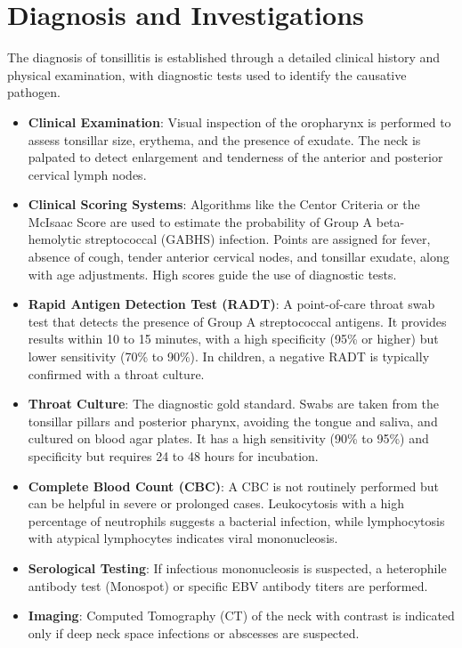 \section*{Diagnosis and Investigations}
The diagnosis of tonsillitis is established through a detailed clinical history and physical examination, with diagnostic tests used to identify the causative pathogen.
\begin{itemize}
    \item \textbf{Clinical Examination}: Visual inspection of the oropharynx is performed to assess tonsillar size, erythema, and the presence of exudate. The neck is palpated to detect enlargement and tenderness of the anterior and posterior cervical lymph nodes.
    \item \textbf{Clinical Scoring Systems}: Algorithms like the Centor Criteria or the McIsaac Score are used to estimate the probability of Group A beta-hemolytic streptococcal (GABHS) infection. Points are assigned for fever, absence of cough, tender anterior cervical nodes, and tonsillar exudate, along with age adjustments. High scores guide the use of diagnostic tests.
    \item \textbf{Rapid Antigen Detection Test (RADT)}: A point-of-care throat swab test that detects the presence of Group A streptococcal antigens. It provides results within 10 to 15 minutes, with a high specificity (95\% or higher) but lower sensitivity (70\% to 90\%). In children, a negative RADT is typically confirmed with a throat culture.
    \item \textbf{Throat Culture}: The diagnostic gold standard. Swabs are taken from the tonsillar pillars and posterior pharynx, avoiding the tongue and saliva, and cultured on blood agar plates. It has a high sensitivity (90\% to 95\%) and specificity but requires 24 to 48 hours for incubation.
    \item \textbf{Complete Blood Count (CBC)}: A CBC is not routinely performed but can be helpful in severe or prolonged cases. Leukocytosis with a high percentage of neutrophils suggests a bacterial infection, while lymphocytosis with atypical lymphocytes indicates viral mononucleosis.
    \item \textbf{Serological Testing}: If infectious mononucleosis is suspected, a heterophile antibody test (Monospot) or specific EBV antibody titers are performed.
    \item \textbf{Imaging}: Computed Tomography (CT) of the neck with contrast is indicated only if deep neck space infections or abscesses are suspected.
\end{itemize}


